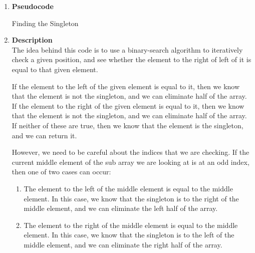 \documentclass{report}
\begin{document}
    \begin{enumerate}
      \item \textbf{Pseudocode}

    \begin{algorithm}
      
      \DontPrintSemicolon
      \caption{Finding the Singleton}


    \end{algorithm}

    \item \textbf{Description} \\

    The idea behind this code is to use a binary-search algorithm to iteratively check a given position, and see whether the element to the right of left of it is equal to that given element. 

    If the element to the left of the given element is equal to it, then we know that the element is not the singleton, and we can eliminate half of the array. If the element to the right of the given element is equal to it, then we know that the element is not the singleton, and we can eliminate half of the array. If neither of these are true, then we know that the element is the singleton, and we can return it.

    However, we need to be careful about the indices that we are checking. If the current middle element of the sub array we are looking at is at an odd index, then one of two cases can occur:
    \begin{enumerate}
      \item The element to the left of the middle element is equal to the middle element. In this case, we know that the singleton is to the right of the middle element, and we can eliminate the left half of the array.
        \item The element to the right of the middle element is equal to the middle element. In this case, we know that the singleton is to the left of the middle element, and we can eliminate the right half of the array.
    \end{enumerate}


\end{enumerate}
\end{document}
